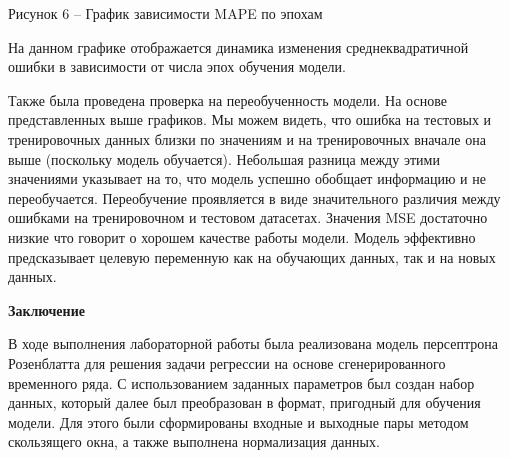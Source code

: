 \documentclass{article}%
\begin{document}
\begin{center}%
Рисунок 6 – График зависимости MAPE по эпохам%
%
\end{center}%
\begin{flushleft}%
На данном графике отображается динамика изменения среднеквадратичной ошибки в зависимости от числа эпох обучения модели.%
%
\end{flushleft}%
\begin{flushleft}%
Также была проведена проверка на переобученность модели. На основе представленных выше графиков. Мы можем видеть, что ошибка на тестовых и %
тренировочных данных близки по значениям и на тренировочных вначале она выше (поскольку модель обучается). Небольшая разница между этими значениями указывает на то, что модель успешно обобщает информацию и не переобучается. Переобучение проявляется в виде значительного различия между ошибками на тренировочном%
 и тестовом датасетах. Значения MSE достаточно низкие что говорит о хорошем качестве работы модели. Модель эффективно предсказывает целевую переменную как на обучающих данных, так и на новых данных.%
%
\end{flushleft}%
\begin{center}%
\textbf{Заключение}%
%
\end{center}%
\begin{flushleft}%
%
\end{flushleft}%
\begin{flushleft}%
В ходе выполнения лабораторной работы была реализована модель персептрона Розенблатта для решения задачи регрессии на основе сгенерированного временного ряда. С использованием заданных параметров был создан набор данных, который далее был преобразован в формат, пригодный для обучения модели. Для этого были сформированы входные и выходные пары методом скользящего окна, а также выполнена нормализация данных.%
%
\end{flushleft}%
\end{document}
